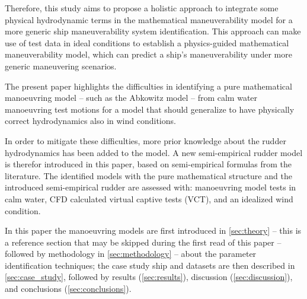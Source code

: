 Therefore, this study aims to propose a holistic approach to integrate some physical hydrodynamic terms in the mathematical maneuverability model for a more generic ship maneuverability system identification. This approach can make use of test data in ideal conditions to establish a physics-guided mathematical maneuverability model, which can predict a ship's maneuverability under more generic maneuvering scenarios.

The present paper highlights the difficulties in identifying a pure mathematical manoeuvring model -- such as the Abkowitz model -- from calm water manoeuvring test motions for a model that should generalize to have physically correct hydrodynamics also in wind conditions. 

In order to mitigate these difficulties, more prior knowledge about the rudder hydrodynamics has been added to the model. A new semi-empirical rudder model is therefor introduced in this paper, based on semi-empirical formulas from the literature. The identified models with the pure mathematical structure and the introduced semi-empirical rudder are assessed with: manoeuvring model tests in calm water, CFD calculated virtual captive tests (VCT), and an idealized wind condition.

In this paper the manoeuvring models are first introduced in \autoref{sec:theory} -- this is a reference section that may be skipped during the first read of this paper -- followed by methodology in \autoref{sec:methodology} -- about the parameter identification techniques; the case study ship and datasets are then described in \autoref{sec:case_study}, followed by results (\autoref{sec:results}), discussion (\autoref{sec:discussion}), and conclusions (\autoref{sec:conclusions}).
